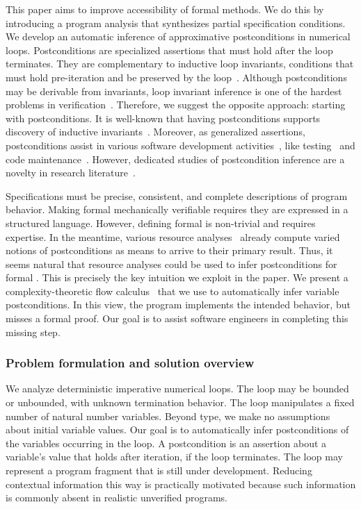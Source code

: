 This paper aims to improve accessibility of formal methods.
We do this by introducing a program analysis that synthesizes partial specification conditions.
We develop an automatic inference of approximative postconditions in numerical loops.
Postconditions are specialized assertions that must hold after the loop terminates.
They are complementary to {inductive loop invariants}, \ie conditions that must hold pre-iteration and be preserved by the loop~\cite{sankaranarayanan2004}.
Although postconditions may be derivable from invariants, loop invariant inference is one of the hardest problems in verification~\cite{dillig2013,si2018}.
Therefore, we suggest the opposite approach: starting with postconditions.
It is well-known that having postconditions supports discovery of inductive invariants~\cite{furia2010}.
Moreover, as generalized assertions, postconditions assist in various software development activities~\cite{nguyen2022}, like testing~\cite{alagarsamy2024,zhang2015} and code maintenance~\cite{rosenblum1995}.
However, dedicated studies of postcondition inference are a novelty in research literature~\cite{popeea2006,molina2021}.

Specifications must be precise, consistent, and complete descriptions of program behavior.
Making formal  mechanically verifiable requires they are expressed in a structured language.
However, defining formal  is non-trivial and requires expertise.
In the meantime, various resource analyses~\cite{jones2009,brockschmidt2016} already compute varied notions of postconditions as means to arrive to their primary result.
Thus, it seems natural that {resource analyses could be used to infer postconditions} for formal .
This is precisely the key intuition we exploit in the paper.
We present a complexity\hyp{}theoretic flow calculus~\cite{jones2009,aubert20222} that we use to automatically infer variable postconditions.
In this view, the program implements the intended behavior, but misses a formal proof.
Our goal is to assist software engineers in completing this missing step.

\subsubsection{Problem formulation and solution overview}
\label{subsec:overview}

We analyze deterministic imperative numerical loops.
The loop may be bounded or unbounded, with unknown termination behavior.
The loop manipulates a fixed number of natural number variables.
Beyond type, we make no assumptions about initial variable values.
Our goal is to automatically infer postconditions of the variables occurring in the loop.
A postcondition is an assertion about a variable's value that holds after iteration, if the loop terminates.
The loop may represent a program {fragment} that is still under development. %
Reducing contextual information this way is practically motivated because such information is commonly absent in realistic unverified programs.

